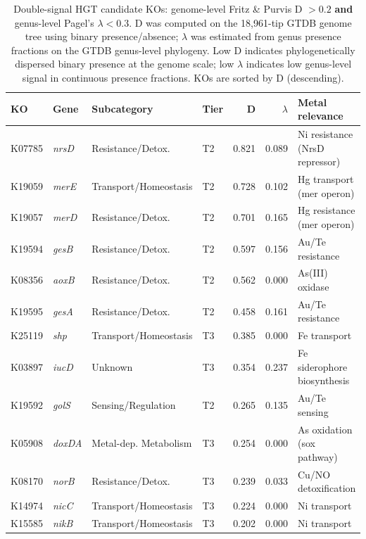 \documentclass[11pt]{article}
\begin{document}
\begin{table}[H]
\caption{Double-signal HGT candidate KOs: genome-level Fritz \& Purvis D $> 0.2$
\textbf{and} genus-level Pagel's $\lambda < 0.3$.
D was computed on the 18{,}961-tip GTDB genome tree using binary presence/absence;
$\lambda$ was estimated from genus presence fractions on the GTDB genus-level
phylogeny.
Low D indicates phylogenetically dispersed binary presence at the genome scale;
low $\lambda$ indicates low genus-level signal in continuous presence fractions.
KOs are sorted by D (descending).}
\label{tab:double_signal}
\centering
\small
\begin{tabular}{llllrrp{3.5cm}}
\toprule
KO & Gene & Subcategory & Tier & D & $\lambda$ & Metal relevance \\
\midrule
K07785 & \textit{nrsD} & Resistance/Detox. & T2 & 0.821 & 0.089 & Ni resistance (NrsD repressor) \\
K19059 & \textit{merE} & Transport/Homeostasis & T2 & 0.728 & 0.102 & Hg transport (mer operon) \\
K19057 & \textit{merD} & Resistance/Detox. & T2 & 0.701 & 0.165 & Hg resistance (mer operon) \\
K19594 & \textit{gesB} & Resistance/Detox. & T2 & 0.597 & 0.156 & Au/Te resistance \\
K08356 & \textit{aoxB} & Resistance/Detox. & T2 & 0.562 & 0.000 & As(III) oxidase \\
K19595 & \textit{gesA} & Resistance/Detox. & T2 & 0.458 & 0.161 & Au/Te resistance \\
K25119 & \textit{shp} & Transport/Homeostasis & T3 & 0.385 & 0.000 & Fe transport \\
K03897 & \textit{iucD} & Unknown & T3 & 0.354 & 0.237 & Fe siderophore biosynthesis \\
K19592 & \textit{golS} & Sensing/Regulation & T2 & 0.265 & 0.135 & Au/Te sensing \\
K05908 & \textit{doxDA} & Metal-dep. Metabolism & T3 & 0.254 & 0.000 & As oxidation (sox pathway) \\
K08170 & \textit{norB} & Resistance/Detox. & T3 & 0.239 & 0.033 & Cu/NO detoxification \\
K14974 & \textit{nicC} & Transport/Homeostasis & T3 & 0.224 & 0.000 & Ni transport \\
K15585 & \textit{nikB} & Transport/Homeostasis & T3 & 0.202 & 0.000 & Ni transport \\
\bottomrule
\end{tabular}
\end{table}
\end{document}
